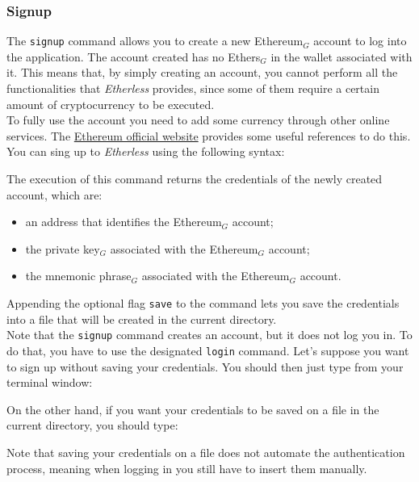 \subsubsection{Signup}
The \texttt{signup} command allows you to create a new Ethereum$_{G}$ account to log into the application. The account created has no Ethers$_{G}$ in the wallet associated with it. This means that, by simply creating an account, you cannot perform all the functionalities that \textit{Etherless} provides, since some of them require a certain amount of cryptocurrency to be executed. \\
To fully use the account you need to add some currency through other online services. The \href{https://ethereum.org/en/wallets/}{Ethereum official website} provides some useful references to do this.\\
You can sing up to \textit{Etherless} using the following syntax:
\begin{center}
\end{center}
\noindent The execution of this command returns the credentials of the newly created account, which are:
\begin{itemize}
	\item an address that identifies the Ethereum$_{G}$ account;
	\item the private key$_{G}$ associated with the Ethereum$_{G}$ account;
	\item the mnemonic phrase$_{G}$ associated with the Ethereum$_{G}$ account.
\end{itemize}
Appending the optional flag \texttt{save} to the command lets you save the credentials into a file that will be created in the current directory. \\
Note that the \texttt{signup} command creates an account, but it does not log you in. To do that, you have to use the designated \texttt{login} command.
Let's suppose you want to sign up without saving your credentials. You should then just type from your terminal window:
\begin{center}
\end{center}
On the other hand, if you want your credentials to be saved on a file in the current directory, you should type:
\begin{center}
\end{center}
Note that saving your credentials on a file does not automate the authentication process, meaning when logging in you still have to insert them manually.

